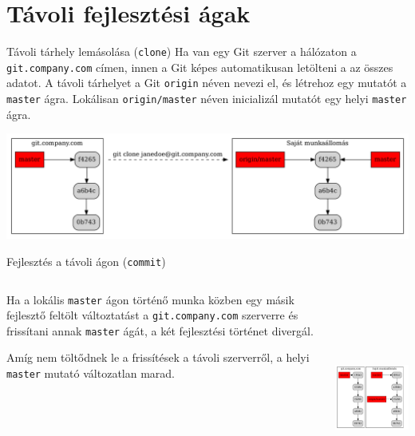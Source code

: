 \documentclass[english, aspectratio=169]{beamer}
\makeatletter
\let\origtableofcontents=\tableofcontents
\def\tableofcontents{\@ifnextchar[{\origtableofcontents}{\gobbletableofcontents}}
\def\gobbletableofcontents#1{\origtableofcontents}
\makeatother
\begin{document}
\section{Távoli fejlesztési ágak}

\begin{frame}
\tableofcontents[currentsection]
\end{frame}

\begin{frame}{Távoli tárhely lemásolása (\texttt{clone})}
Ha van egy Git szerver a hálózaton a \texttt{git.company.com} címen, innen a Git képes automatikusan letölteni a az összes adatot. A távoli tárhelyet a Git \texttt{origin} néven nevezi el, és létrehoz egy mutatót a \texttt{master} ágra. Lokálisan \texttt{origin/master} néven inicializál mutatót egy helyi \texttt{master} ágra.
\begin{center}
\includegraphics[width=14cm]{graphs/git_23.png}
\end{center}
\end{frame}

\begin{frame}{Fejlesztés a távoli ágon (\texttt{commit})}
\begin{columns}
\begin{column}{.5\textwidth}
Ha a lokális \texttt{master} ágon történő munka közben egy másik fejlesztő feltölt változtatást a \texttt{git.company.com} szerverre és frissítani annak \texttt{master} ágát, a két fejlesztési történet divergál.\par\smallskip
Amíg nem töltődnek le a frissítések a távoli szerverről, a helyi \texttt{master} mutató változatlan marad.
\end{column}
\begin{column}{.5\textwidth}
\begin{center}
\includegraphics[width=7cm, height=7cm, keepaspectratio]{graphs/git_24.png}
\end{center}
\end{column}
\end{columns}
\end{frame}
\end{document}
